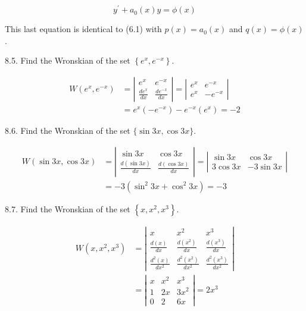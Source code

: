 \documentclass[10pt]{article}
\begin{document}
$$
y^{\prime}+a_{0}(x) y=\phi(x)
$$

This last equation is identical to (6.1) with $p(x)=a_{0}(x)$ and $q(x)=\phi(x)$.

8.5. Find the Wronskian of the set $\left\{e^{x}, e^{-x}\right\}$.

$$
\begin{aligned}
W\left(e^{x}, e^{-x}\right) & =\left|\begin{array}{cc}
e^{x} & e^{-x} \\
\frac{d e^{x}}{d x} & \frac{d e^{-x}}{d x}
\end{array}\right|=\left|\begin{array}{cc}
e^{x} & e^{-x} \\
e^{x} & -e^{-x}
\end{array}\right| \\
& =e^{x}\left(-e^{-x}\right)-e^{-x}\left(e^{x}\right)=-2
\end{aligned}
$$

8.6. Find the Wronskian of the set $\{\sin 3 x, \cos 3 x\}$.

$$
\begin{aligned}
W(\sin 3 x, \cos 3 x) & =\left|\begin{array}{cc}
\sin 3 x & \cos 3 x \\
\frac{d(\sin 3 x)}{d x} & \frac{d(\cos 3 x)}{d x}
\end{array}\right|=\left|\begin{array}{cc}
\sin 3 x & \cos 3 x \\
3 \cos 3 x & -3 \sin 3 x
\end{array}\right| \\
& =-3\left(\sin ^{2} 3 x+\cos ^{2} 3 x\right)=-3
\end{aligned}
$$

8.7. Find the Wronskian of the set $\left\{x, x^{2}, x^{3}\right\}$.

$$
\begin{aligned}
W\left(x, x^{2}, x^{3}\right) & =\left|\begin{array}{ccc}
x & x^{2} & x^{3} \\
\frac{d(x)}{d x} & \frac{d\left(x^{2}\right)}{d x} & \frac{d\left(x^{3}\right)}{d x} \\
\frac{d^{2}(x)}{d x^{2}} & \frac{d^{2}\left(x^{2}\right)}{d x^{2}} & \frac{d^{2}\left(x^{3}\right)}{d x^{2}}
\end{array}\right| \\
& =\left|\begin{array}{ccc}
x & x^{2} & x^{3} \\
1 & 2 x & 3 x^{2} \\
0 & 2 & 6 x
\end{array}\right|=2 x^{3}
\end{aligned}
$$
\end{document}
